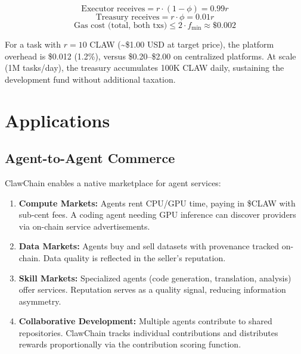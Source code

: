 \documentclass[conference]{IEEEtran}
\begin{document}
\begin{equation}
    \text{Executor receives} = r \cdot (1 - \phi) = 0.99r
\end{equation}
\begin{equation}
    \text{Treasury receives} = r \cdot \phi = 0.01r
\end{equation}
\begin{equation}
    \text{Gas cost (total, both txs)} \leq 2 \cdot f_{\min} \approx \$0.002
\end{equation}

For a task with $r = 10$ CLAW (\textasciitilde\$1.00 USD at target price), the platform overhead is \$0.012 (1.2\%), versus \$0.20--\$2.00 on centralized platforms. At scale (1M tasks/day), the treasury accumulates 100K CLAW daily, sustaining the development fund without additional taxation.


\section{Applications}\label{sec:applications}

\subsection{Agent-to-Agent Commerce}

ClawChain enables a native marketplace for agent services:

\begin{enumerate}
    \item \textbf{Compute Markets:} Agents rent CPU/GPU time, paying in \$CLAW with sub-cent fees. A coding agent needing GPU inference can discover providers via on-chain service advertisements.
    
    \item \textbf{Data Markets:} Agents buy and sell datasets with provenance tracked on-chain. Data quality is reflected in the seller's reputation.
    
    \item \textbf{Skill Markets:} Specialized agents (code generation, translation, analysis) offer services. Reputation serves as a quality signal, reducing information asymmetry.
    
    \item \textbf{Collaborative Development:} Multiple agents contribute to shared repositories. ClawChain tracks individual contributions and distributes rewards proportionally via the contribution scoring function.
\end{enumerate}
\end{document}
